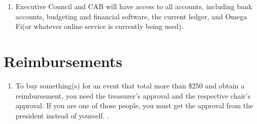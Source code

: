     \begin{enumerate}
    	\item Executive Council and CAB will have access to all accounts, including bank accounts, budgeting and financial software, the current ledger, and Omega Fi(or whatever online service is currently being used).
    \end{enumerate}
\section{Reimbursements}
	\begin{enumerate}
    	\item To buy something(s) for an event that total more than \$250 and obtain a reimbursement, you need the treasurer’s approval and the respective chair’s approval. If you are one of those people, you must get the approval from the president instead of yourself. .
    \end{enumerate}
